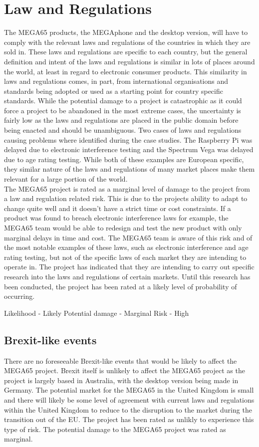 \section{Law and Regulations}
The MEGA65 products, the MEGAphone and the desktop version, will have to comply with the relevant laws and regulations of the countries in which they are sold in. These laws and regulations are specific to each country, but the general definition and intent of the laws and regulations is similar in lots of places around the world, at least in regard to electronic consumer products. This similarity in laws and regulations comes, in part, from international organisations and standards being adopted or used as a starting point for country specific standards. While the potential damage to a project is catastrophic as it could force a project to be abandoned in the most extreme cases, the uncertainty is fairly low as the laws and regulations are placed in the public domain before being enacted and should be unambiguous. Two cases of laws and regulations causing problems where identified during the case studies. The Raspberry Pi was delayed due to electronic interference testing and the Spectrum Vega was delayed due to age rating testing. While both of these examples are European specific, they similar nature of the laws and regulations of many market places make them relevant for a large portion of the world. \\

The MEGA65 project is rated as a marginal level of damage to the project from a law and regulation related risk. This is due to the projects ability to adapt to change quite well and it doesn't have a strict time or cost constraints. If a product was found to breach electronic interference laws for example, the MEGA65 team would be able to redesign and test the new product with only marginal delays in time and cost. The MEGA65 team is aware of this risk and of the most notable examples of these laws, such as electronic interference and age rating testing, but not of the specific laws of each market they are intending to operate in. The project has indicated that they are intending to carry out specific research into the laws and regulations of certain markets. Until this research has been conducted, the project has been rated at a likely level of probability of occurring. 

Likelihood - Likely  
Potential damage - Marginal
Risk - High


\subsection{Brexit-like events}
There are no foreseeable Brexit-like events that would be likely to affect the MEGA65 project. Brexit itself is unlikely to affect the MEGA65 project as the project is largely based in Australia, with the desktop version being made in Germany. The potential market for the MEGA65 in the United Kingdom is small and there will likely be some level of agreement with current laws and regulations within the United Kingdom to reduce to the disruption to the market during the transition out of the EU. The project has been rated as unlikly to experience this type of risk. The potential damage to the MEGA65 project was rated as marginal.

